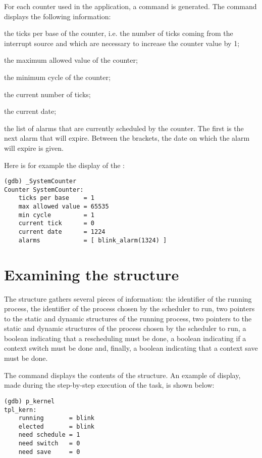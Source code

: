 For each counter used in the application, a command  is generated. The command displays the following information:

\begin{pitemize}
\item the ticks per base of the counter, i.e. the number of ticks coming from the interrupt source and which are necessary to increase the counter value by 1;
\item the maximum allowed value of the counter;
\item the minimum cycle of the counter;
\item the current number of ticks;
\item the current date;
\item the list of alarms that are currently scheduled by the counter. The first is the next alarm that will expire. Between the brackets, the date on which the alarm will expire is given.
\end{pitemize}

Here is for example the display of the :

\begin{lstlisting}
(gdb) _SystemCounter 
Counter SystemCounter:
	ticks per base    = 1
	max allowed value = 65535
	min cycle         = 1
	current tick      = 0
	current date      = 1224
	alarms            = [ blink_alarm(1324) ]
\end{lstlisting}

\section{Examining the  structure}

The  structure gathers several pieces of information: the identifier of the running process, the identifier of the process chosen by the scheduler to run, two pointers to the static and dynamic structures of the running process, two pointers to the static and dynamic structures of the process chosen by the scheduler to run, a boolean indicating that a rescheduling must be done, a boolean indicating if a context switch must be done and, finally, a boolean indicating that a context save must be done.  

The  command displays the contents of the  structure. An example of display, made during the step-by-step execution of the  task, is shown below:

\begin{lstlisting}
(gdb) p_kernel 
tpl_kern:
	running       = blink
	elected       = blink
	need schedule = 1
	need switch   = 0
	need save     = 0
\end{lstlisting}


